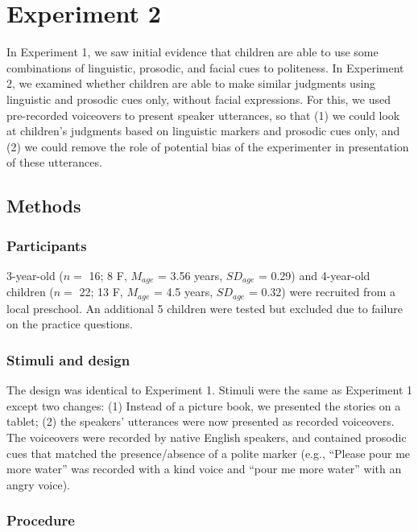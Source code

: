 \documentclass[10pt, letterpaper]{article}
\begin{document}
\section{Experiment 2}\label{experiment-2}

In Experiment 1, we saw initial evidence that children are able to use
some combinations of linguistic, prosodic, and facial cues to
politeness. In Experiment 2, we examined whether children are able to
make similar judgments using linguistic and prosodic cues only, without
facial expressions. For this, we used pre-recorded voiceovers to present
speaker utterances, so that (1) we could look at children's judgments
based on linguistic markers and prosodic cues only, and (2) we could
remove the role of potential bias of the experimenter in presentation of
these utterances.

\subsection{Methods}\label{methods-1}

\subsubsection{Participants}\label{participants-1}

3-year-old (\(n=\) 16; 8 F, \(M_{age}\) = 3.56 years, \(SD_{age}\) =
0.29) and 4-year-old children (\(n=\) 22; 13 F, \(M_{age}\) = 4.5 years,
\(SD_{age}\) = 0.32) were recruited from a local preschool. An
additional 5 children were tested but excluded due to failure on the
practice questions.

\subsubsection{Stimuli and design}\label{stimuli-and-design-1}

The design was identical to Experiment 1. Stimuli were the same as
Experiment 1 except two changes: (1) Instead of a picture book, we
presented the stories on a tablet; (2) the speakers' utterances were now
presented as recorded voiceovers. The voiceovers were recorded by native
English speakers, and contained prosodic cues that matched the
presence/absence of a polite marker (e.g., ``Please pour me more water''
was recorded with a kind voice and ``pour me more water'' with an angry
voice).

\subsubsection{Procedure}\label{procedure-1}
\end{document}

